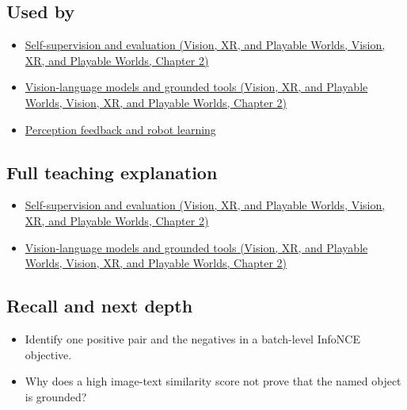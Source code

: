 \subsection{Used by}\label{appendix-772f1fd96148-used-by}

\begin{itemize}
\tightlist
\item
  \href{../07-Vision-XR-and-Playable-Worlds/main.pdf\#nameddest=04-visual-computing-ii-ch031-self-supervision-and-evaluation}{Self-supervision and evaluation (Vision, XR, and Playable Worlds, Vision, XR, and Playable Worlds, Chapter 2)}
\item
  \href{../07-Vision-XR-and-Playable-Worlds/main.pdf\#nameddest=04-visual-computing-ii-ch031-vision-language-models-and-grounded-tools}{Vision-language models and grounded tools (Vision, XR, and Playable Worlds, Vision, XR, and Playable Worlds, Chapter 2)}
\item
  \hyperref[appendix-b0c42da325f1]{Perception feedback and robot learning}
\end{itemize}

\subsection{Full teaching explanation}\label{appendix-772f1fd96148-full-teaching-explanation}

\begin{itemize}
\tightlist
\item
  \href{../07-Vision-XR-and-Playable-Worlds/main.pdf\#nameddest=04-visual-computing-ii-ch031-self-supervision-and-evaluation}{Self-supervision and evaluation (Vision, XR, and Playable Worlds, Vision, XR, and Playable Worlds, Chapter 2)}
\item
  \href{../07-Vision-XR-and-Playable-Worlds/main.pdf\#nameddest=04-visual-computing-ii-ch031-vision-language-models-and-grounded-tools}{Vision-language models and grounded tools (Vision, XR, and Playable Worlds, Vision, XR, and Playable Worlds, Chapter 2)}
\end{itemize}

\subsection{Recall and next depth}\label{appendix-772f1fd96148-recall-and-next-depth}

\begin{itemize}
\tightlist
\item
  Identify one positive pair and the negatives in a batch-level InfoNCE objective.
\item
  Why does a high image-text similarity score not prove that the named object is grounded?
\end{itemize}

